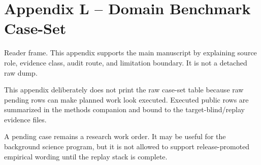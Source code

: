 \section{Appendix L -- Domain Benchmark Case-Set}
Reader frame. This appendix supports the main manuscript by explaining source role, evidence class, audit route, and limitation boundary. It is not a detached raw dump.


\label{sec:oc-core-1-3-domain-benchmark-caseset-summary}

This appendix deliberately does not print the raw case-set table because raw pending rows can make planned work look executed. Executed public rows are summarized in the methods companion and bound to the target-blind/replay evidence files.


A pending case remains a research work order. It may be useful for the background science program, but it is not allowed to support release-promoted empirical wording until the replay stack is complete.
